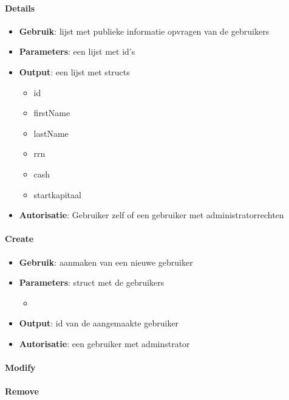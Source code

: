 \paragraph{Details}

\begin{itemize}
\item{\textbf{Gebruik}: lijst met publieke informatie opvragen van de gebruikers}
\item{\textbf{Parameters}: een lijst met id's}
\item{\textbf{Output}: een lijst met structs}
	\begin{itemize}
	\item{id}
	\item{firstName}
	\item{lastName}
	\item{rrn}
	\item{cash}
	\item{startkapitaal}
	\end{itemize}
\item{\textbf{Autorisatie}: Gebruiker zelf of een gebruiker met administratorrechten}
\end{itemize}

\paragraph{Create}

\begin{itemize}
\item{\textbf{Gebruik}: aanmaken van een nieuwe gebruiker}
\item{\textbf{Parameters}: struct met de gebruikers}
	\begin{itemize}
	\item{}
	\end{itemize}
\item{\textbf{Output}: id van de aangemaakte gebruiker}
\item{\textbf{Autorisatie}: een gebruiker met adminstrator}
\end{itemize}

\paragraph{Modify}

\paragraph{Remove}

